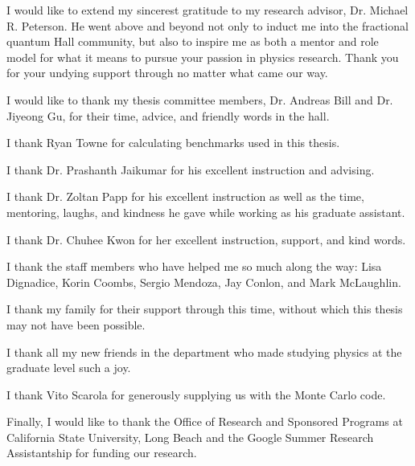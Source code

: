 \doublespacing

I would like to extend my sincerest gratitude to my research advisor, Dr. Michael R. Peterson. He went above and beyond not only to induct me into the fractional quantum Hall community, but also to inspire me as both a mentor and role model for what it means to pursue your passion in physics research. Thank you for your undying support through no matter what came our way.

I would like to thank my thesis committee members, Dr. Andreas Bill and Dr. Jiyeong Gu, for their time, advice, and friendly words in the hall.

I thank Ryan Towne for calculating benchmarks used in this thesis.

I thank Dr. Prashanth Jaikumar for his excellent instruction and advising.

I thank Dr. Zoltan Papp for his excellent instruction as well as the time, mentoring, laughs, and kindness he gave while working as his graduate assistant.

I thank Dr. Chuhee Kwon for her excellent instruction, support, and kind words.

I thank the staff members who have helped me so much along the way: Lisa Dignadice, Korin Coombs, Sergio Mendoza, Jay Conlon, and Mark McLaughlin.

I thank my family for their support through this time, without which this thesis may not have been possible.

I thank all my new friends in the department who made studying physics at the graduate level such a joy.

I thank Vito Scarola for generously supplying us with the Monte Carlo code.

Finally, I would like to thank the Office of Research and Sponsored Programs at California State University, Long Beach and the Google Summer Research Assistantship for funding our research.

\singlespacing